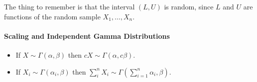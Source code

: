 The thing to remember is that the interval \((L,U)\) is random, since \(L\) and \(U\) are functions of the random sample \(X_1, \dots, X_n\).

\paragraph{Scaling and Independent Gamma Distributions}
\begin{itemize}
    \item If \(X \sim \Gamma(\alpha, \beta)\) then \(cX \sim \Gamma(\alpha, c\beta)\).
    \item If \(X_i \sim \Gamma(\alpha_i, \beta)\) then \(\sum_i^n X_i \sim \Gamma\left(\sum_{i=1}^n \alpha_i, \beta\right)\).
\end{itemize}